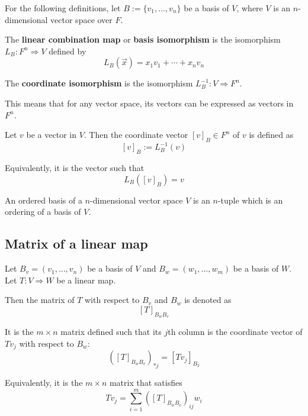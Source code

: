 For the following definitions, let $B := \{ v_1, \ldots, v_n \}$ be a basis of $V$, where $V$ is an $n$-dimensional vector space over $F$.

\begin{definition}
  The \textbf{linear combination map} or \textbf{basis isomorphism} is the isomorphism $L_B : F^n \Rightarrow V$ defined by
  \[
    L_B(\vec{x}) = x_1 v_1 + \cdots + x_n v_n
  \]
\end{definition}

\begin{definition}
  The \textbf{coordinate isomorphism} is the isomorphism $L_B^{-1} : V \Rightarrow 
  F^n$.

  This means that for any vector space, its vectors can be expressed as vectors in $F^n$.
\end{definition}

\begin{definition}
  Let $v$ be a vector in $V$. Then the coordinate vector $[v]_B \in F^n$ of $v$ is defined as 
  \[
    [v]_B := L_B^{-1}(v)
  \]

  Equivalently, it is the vector such that
  \[
    L_B([v]_B) = v
  \]
\end{definition}

\begin{definition}
  An ordered basis of a $n$-dimensional vector space $V$ is an $n$-tuple which is an ordering of a basis of $V$.
\end{definition}

\subsection{Matrix of a linear map}

\begin{definition}
  Let $B_v = (v_1, \ldots, v_n)$ be a basis of $V$ and $B_w = (w_1, \ldots, w_m)$ be a basis of $W$. Let $T : V \Rightarrow W$ be a linear map.
  
  Then the matrix of $T$ with respect to $B_v$ and $B_w$ is denoted as
  \[
    [T]_{B_w B_v}
  \]
  
  It is the $m \times n$ matrix defined such that its $j$th column is the coordinate vector of $T v_j$ with respect to $B_w$:
  \[
    \left([T]_{B_w B_v}\right)_{*j} = [T v_j]_{B_2}
  \]

  Equivalently, it is the $m \times n$ matrix that satisfies
  \[
    T v_j = \sum_{i = 1}^m \left([T]_{B_w B_v}\right)_{ij} w_i
  \]
\end{definition}

